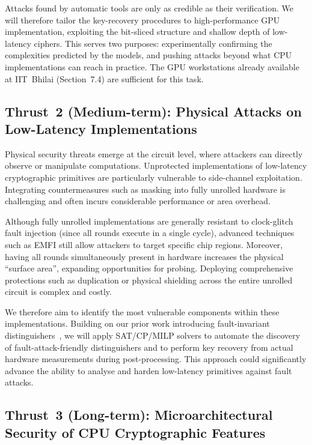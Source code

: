 Attacks found by automatic tools are only as credible as their verification.
We will therefore tailor the key-recovery procedures to high-performance GPU implementation, exploiting the bit-sliced structure and shallow depth of low-latency ciphers.
This serves two purposes: experimentally confirming the complexities predicted by the models, and pushing attacks beyond what CPU implementations can reach in practice.
The GPU workstations already available at IIT~Bhilai (Section~7.4) are sufficient for this task.

\subsection{Thrust~2 (Medium-term): Physical Attacks on Low-Latency Implementations}

Physical security threats emerge at the circuit level, where attackers can directly observe or manipulate computations.
Unprotected implementations of low-latency cryptographic primitives are particularly vulnerable to side-channel exploitation.
Integrating countermeasures such as masking into fully unrolled hardware is challenging and often incurs considerable performance or area overhead.

Although fully unrolled implementations are generally resistant to clock-glitch fault injection (since all rounds execute in a single cycle), advanced techniques such as EMFI still allow attackers to target specific chip regions.
Moreover, having all rounds simultaneously present in hardware increases the physical ``surface area'', expanding opportunities for probing.
Deploying comprehensive protections such as duplication or physical shielding across the entire unrolled circuit is complex and costly.

We therefore aim to identify the most vulnerable components within these implementations.
Building on our prior work introducing fault-invariant distinguishers~, we will apply SAT/CP/MILP solvers to automate the discovery of fault-attack-friendly distinguishers and to perform key recovery from actual hardware measurements during post-processing.
This approach could significantly advance the ability to analyse and harden low-latency primitives against fault attacks.

\subsection{Thrust~3 (Long-term): Microarchitectural Security of CPU Cryptographic Features}


